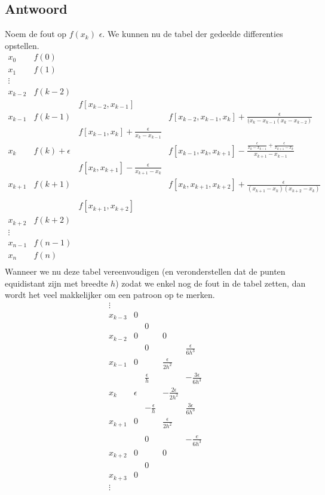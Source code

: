 \documentclass[examenvragen.tex]{subfiles}
\begin{document}
\subsection{Antwoord}
Noem de fout op $f(x_k)$ $\epsilon$. We kunnen nu de tabel der gedeelde differenties opstellen.
\[
\begin{array}{cccccccccc}
x_0 & f(0) \\
x_1 & f(1) \\
\vdots\\
x_{k-2} & f(k-2) \\
&& f[x_{k-2},x_{k-1}]\\
x_{k-1} & f(k-1) && f[x_{k-2},x_{k-1},x_{k}] + \frac{\epsilon}{(x_{k}-x_{k-1}(x_{k}-x_{k-2})}\\
&& f[x_{k-1},x_{k}] + \frac{\epsilon}{x_k-x_{k-1}}\\
x_{k} & f(k) +\epsilon && f[x_{k-1},x_{k},x_{k+1}] -\frac{\frac{\epsilon}{x_k-x_{k-1}}+\frac{\epsilon}{x_{k+1}-x_{k}}}{x_{k+1}-x_{k-1}}\\
&& f[x_{k},x_{k+1}] - \frac{\epsilon}{x_{k+1}-x_{k}}\\
x_{k+1} & f(k+1) && f[x_{k},x_{k+1},x_{k+2}] + \frac{\epsilon}{(x_{k+1}-x_{k})(x_{k+2}-x_{k})}\\\\
&& f[x_{k+1},x_{k+2}]\\
x_{k+2} & f(k+2) \\
\vdots\\
x_{n-1} & f(n-1) \\
x_n & f(n) \\
\end{array}
\]
Wanneer we nu deze tabel vereenvoudigen (en veronderstellen dat de punten equidistant zijn met breedte $h$) zodat we enkel nog de fout in de tabel zetten, dan wordt het veel makkelijker om een patroon op te merken.
\[
\begin{array}{cccccccccc}
\vdots\\
x_{k-3} & 0 \\
&& 0 \\
x_{k-2} & 0 && 0\\
&& 0 && \frac{\epsilon}{6h^3}\\
x_{k-1} & 0 && \frac{\epsilon}{2h^2}\\
&& \frac{\epsilon}{h} && -\frac{3\epsilon}{6h^3}\\
x_{k} & \epsilon && -\frac{2\epsilon}{2h^2}\\
&& - \frac{\epsilon}{h}&& \frac{3\epsilon}{6h^3}\\
x_{k+1} & 0 && \frac{\epsilon}{2h^2}\\\\
&& 0 && -\frac{e}{6h^3}\\
x_{k+2} & 0 && 0\\
&& 0\\
x_{k+3} & 0 \\
\vdots\\
\end{array}
\]
\end{document}
